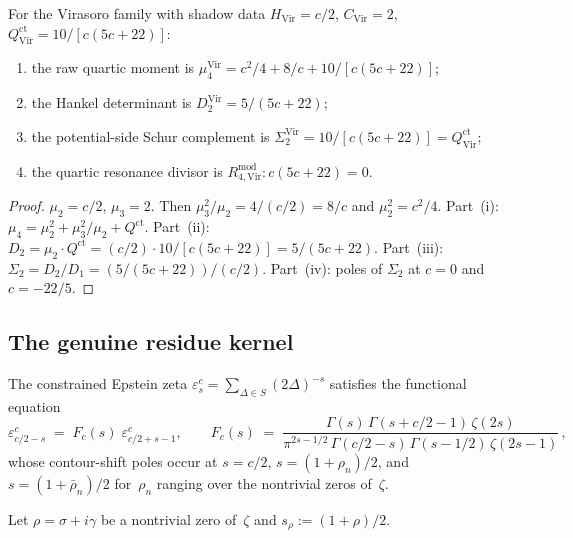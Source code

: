 \begin{proposition}[\ClaimStatusProvedHere]%
\label{prop:virasoro-quartic-determinant}%
%
For the Virasoro family with shadow data
$H_{\mathrm{Vir}} = c/2$,\; $C_{\mathrm{Vir}} = 2$,\;
$Q_{\mathrm{Vir}}^{\mathrm{ct}} = 10/[c(5c{+}22)]$\textup{:}
\begin{enumerate}[label=\textup{(\roman*)}]
\item
the raw quartic moment is
$\mu_4^{\mathrm{Vir}} = c^2/4 + 8/c + 10/[c(5c{+}22)]$\textup;
\item
the Hankel determinant is
$D_2^{\mathrm{Vir}} = 5/(5c{+}22)$\textup;
\item
the potential-side Schur complement is
$\Sigma_2^{\mathrm{Vir}} = 10/[c(5c{+}22)]
= Q_{\mathrm{Vir}}^{\mathrm{ct}}$\textup;
\item
the quartic resonance divisor is
$R_{4,\mathrm{Vir}}^{\mathrm{mod}}\colon c(5c{+}22) = 0$.
\end{enumerate}
\end{proposition}

\begin{proof}
$\mu_2 = c/2$, $\mu_3 = 2$. Then
$\mu_3^2/\mu_2 = 4/(c/2) = 8/c$ and $\mu_2^2 = c^2/4$.
Part~(i): $\mu_4 = \mu_2^2 + \mu_3^2/\mu_2 + Q^{\mathrm{ct}}$.
Part~(ii): $D_2 = \mu_2\cdot Q^{\mathrm{ct}}
= (c/2)\cdot 10/[c(5c{+}22)] = 5/(5c{+}22)$.
Part~(iii): $\Sigma_2 = D_2/D_1 = (5/(5c{+}22))/(c/2)$.
Part~(iv): poles of $\Sigma_2$ at $c = 0$ and $c = -22/5$.
\end{proof}

\subsection{The genuine residue kernel}%
\label{sec:genuine-residue-kernel}

The constrained Epstein zeta
$\varepsilon^c_s = \sum_{\Delta \in S}(2\Delta)^{-s}$
satisfies the functional equation
\begin{equation}\label{eq:constrained-epstein-fe}
\varepsilon^c_{c/2-s}
\;=\;
F_c(s)\;\varepsilon^c_{c/2+s-1},
\qquad
F_c(s)
\;=\;
\frac{\Gamma(s)\,\Gamma(s{+}c/2{-}1)\,\zeta(2s)}
{\pi^{2s-1/2}\,
\Gamma(c/2{-}s)\,\Gamma(s{-}1/2)\,\zeta(2s{-}1)}\,,
\end{equation}
whose contour-shift poles occur at
$s = c/2$, $s = (1{+}\rho_n)/2$, and
$s = (1{+}\bar\rho_n)/2$
for~$\rho_n$ ranging over the nontrivial zeros of~$\zeta$.

Let $\rho = \sigma + i\gamma$ be a nontrivial zero of~$\zeta$
and $s_\rho := (1{+}\rho)/2$.

